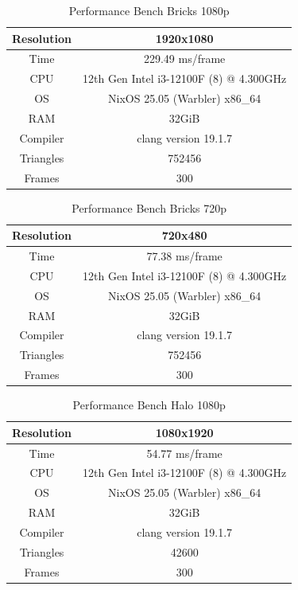 \documentclass[12pt]{article}
\begin{document}
\begin{table}[H]
	\caption{Performance Bench Bricks 1080p}
	\centering
	\begin{tabular}{|c|c|}
		\hline
		Resolution& 1920x1080\\\hline
		Time& 229.49 ms/frame\\\hline
		CPU&12th Gen Intel i3-12100F (8) @ 4.300GHz\\\hline
		OS&NixOS 25.05 (Warbler) x86\_64\\\hline
		RAM&32GiB\\\hline
		Compiler&clang version 19.1.7\\\hline
		Triangles&752456\\\hline
		Frames&300\\\hline
	\end{tabular}
	\label{table:performance-1080-brick}
\end{table}

\begin{table}[H]
	\caption{Performance Bench Bricks 720p}
	\centering
	\begin{tabular}{|c|c|}
		\hline
		Resolution& 720x480\\\hline
		Time& 77.38 ms/frame\\\hline
		CPU&12th Gen Intel i3-12100F (8) @ 4.300GHz\\\hline
		OS&NixOS 25.05 (Warbler) x86\_64\\\hline
		RAM&32GiB\\\hline
		Compiler&clang version 19.1.7\\\hline
		Triangles&752456\\\hline
		Frames&300\\\hline
	\end{tabular}
	\label{table:performance-720-brick}
\end{table}

\begin{table}[H]
	\caption{Performance Bench Halo 1080p}
	\centering
	\begin{tabular}{|c|c|}
		\hline
		Resolution& 1080x1920\\\hline
		Time& 54.77 ms/frame\\\hline
		CPU&12th Gen Intel i3-12100F (8) @ 4.300GHz\\\hline
		OS&NixOS 25.05 (Warbler) x86\_64\\\hline
		RAM&32GiB\\\hline
		Compiler&clang version 19.1.7\\\hline
		Triangles&42600\\\hline
		Frames&300\\\hline
	\end{tabular}
	\label{table:performance-1080-halo}
\end{table}
\end{document}
